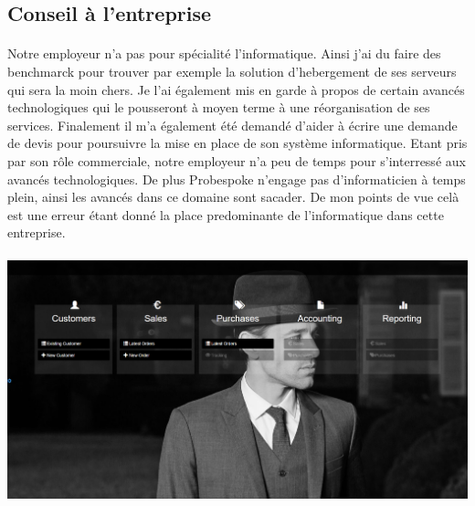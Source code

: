  \subsection{Conseil à l'entreprise}
 \paragraph{}
 Notre employeur n'a pas pour spécialité l'informatique. Ainsi j'ai du faire des benchmarck pour trouver par exemple la solution d'hebergement de ses serveurs qui sera la moin chers. Je l'ai également mis en garde à propos de certain avancés technologiques qui le pousseront à moyen terme à une réorganisation de ses services. Finalement il m'a également été demandé d'aider à écrire une demande de devis pour poursuivre la mise en place de son système informatique. Etant pris par son rôle commerciale, notre employeur n'a peu de temps pour s'interressé aux avancés technologiques. De plus Probespoke n'engage pas d'informaticien à temps plein, ainsi les avancés dans ce domaine sont sacader. De mon points de vue celà est une erreur étant donné la place predominante de l'informatique dans cette entreprise.
 \paragraph{}
 \includegraphics[width=16cm]{image/prise.png}
